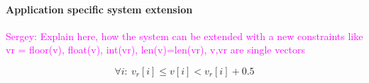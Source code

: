 \documentclass{sig-alternate-05-2015}
\newcommand{\sergey}[1]{\textcolor{magenta}{{\sc Sergey:} #1}\xspace}
\newcommand{\samuel}[1]{\textcolor{green}{{\sc Samuel:} #1}\xspace}
\newcommand{\constraints}{\ensuremath{\mathcal{T}}\xspace}
\newcommand{\format}[1]{\textit{#1}\xspace}
\newcommand{\extractgroups}{\format{extractGroups}}
\newcommand{\extracttables}{\format{extractTables}}
\newcommand{\learnconstraints}{\format{learnConstraints}}
\newcommand{\dependencies}{\ensuremath{\mathcal{D}}\xspace}
\begin{document}
\paragraph{Application specific system extension}
\sergey{Explain here, how the system can be extended with a new constraints like vr = floor(v), float(v), int(vr), len(v)=len(vr), v,vr are single vectors}

\begin{equation}
  \forall i{:}~ v_r[i] \leq v[i] < v_r[i] + 0.5
  \label{eq:floor_extension}
\end{equation}





\newcommand{\runtotal}{16.12}
\newcommand{\runtotalstd}{0.62}

\newcommand{\runfile}{0.50}
\newcommand{\runfilestd}{0.02}
\end{document}
